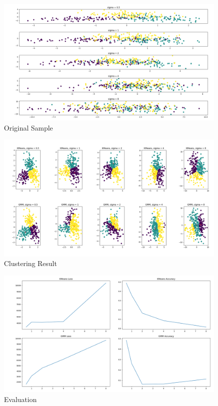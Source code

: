 \documentclass[a4paper]{article}
\theoremstyle{definition}
\newenvironment{soln}{
    \leavevmode\color{blue}\ignorespaces
}{}
\begin{document}
\begin{soln}
	\begin{soln}
		\begin{figure}[H]
			\centering
			\includegraphics[width=1\textwidth]{img/1_2_1.png}
			\caption*{Original Sample}
		\end{figure}
		\begin{figure}[H]
			\centering
			\includegraphics[width=1\textwidth]{img/1_2_2.png}
			\caption*{Clustering Result}
		\end{figure}
		\begin{figure}[H]
			\centering
			\includegraphics[width=1\textwidth]{img/1_2_3.png}
			\caption*{Evaluation}
		\end{figure}
	\end{soln}
\end{soln}
\end{document}
